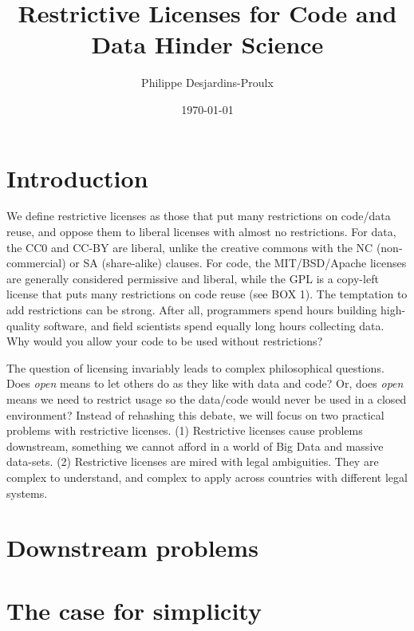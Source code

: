 \documentclass[letterpaper]{article}
\begin{document}
\title{Restrictive Licenses for Code and Data Hinder Science}
\author[0,1,2]{Philippe Desjardins-Proulx}
\date{\today}
\maketitle

\section{Introduction}


We define restrictive licenses as those that put many restrictions on code/data
reuse, and oppose them to liberal licenses with almost no restrictions. For
data, the CC0 and CC-BY are liberal, unlike the creative commons with the NC
(non-commercial) or SA (share-alike) clauses. For code, the MIT/BSD/Apache
licenses are generally considered permissive and liberal, while the GPL is a
copy-left license that puts many restrictions on code reuse (see BOX 1). The
temptation to add restrictions can be strong. After all, programmers spend
hours building high-quality software, and field scientists spend equally long
hours collecting data. Why would you allow your code to be used without 
restrictions?

The question of licensing invariably leads to complex philosophical questions.
Does \emph{open} means to let others do as they like with data and code? Or,
does \emph{open} means we need to restrict usage so the data/code would never
be used in a closed environment? Instead of rehashing this debate, we will
focus on two practical problems with restrictive licenses. (1) Restrictive
licenses cause problems downstream, something we cannot afford in a world of
Big Data and massive data-sets. (2) Restrictive licenses are mired with legal
ambiguities. They are complex to understand, and complex to apply across
countries with different legal systems.

\section{Downstream problems}

\section{The case for simplicity}
\end{document}
